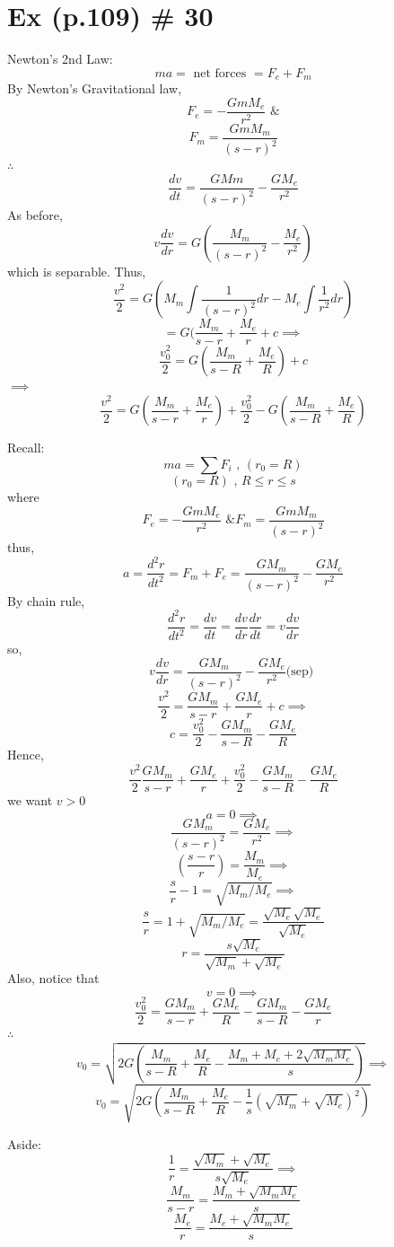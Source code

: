 \documentclass[10pt,a4paper]{article}
\theoremstyle{definition}
\begin{document}
\section*{Ex (p.109) \# 30}
  Newton's 2nd Law: 
  \[ ma = \text{ net forces } = F_e + F_m \]
  By Newton's Gravitational law, 
  \[ F_e = - \frac{GmM_e}{r^2} \text{ \& } \]
  \[ F_m = \frac{GmM_m}{(s-r)^2} \]
  \( \therefore \)
  \[ \frac{dv}{dt} = \frac{GMm}{(s-r)^2}- \frac{GM_e}{r^2} \]
  As before, 
  \[ v \frac{dv}{dr} = G( \frac{M_m}{(s-r)^2} - \frac{M_e}{r^2}) \]
  which is separable. Thus, 
  \[ \frac{v^2}{2} = G( M_m \int \frac{1}{(s-r)^2}dr - M_e \int
  \frac{1}{r^2}dr)  \]
  \[ = G( \frac{M_m}{s-r} + \frac{M_e}{r} + c \implies \]
  \[ \frac{v_0^2}{2} = G( \frac{M_m}{s-R} + \frac{M_e}{R}) + c \]
  \( \implies \)
  \[ \frac{v^2}{2} = G ( \frac{M_m}{s-r} + \frac{M_e}{r}) +
  \frac{v_0^2}{2} -G( \frac{M_m}{s-R}+ \frac{M_e}{R})
  \]

  \newpage
  Recall: 
  \[ ma = \sum F_i \text{ , } (r_0 = R) \]
  \[(r_0 = R) \text{ ,  } R \leq r \leq s \]
  where
  \[ F_e = - \frac{GmM_e}{r^2} \text{ \& } F_m = \frac{GmM_m}{(s-r)^2} \]
  thus, 
  \[ a = \frac{d^2r}{dt^2} = F_m + F_e = \frac{GM_m}{(s-r)^2}-
  \frac{GM_e}{r^2} \]
  By chain rule, 
  \[ \frac{d^2r}{dt^2} = \frac{dv}{dt} = \frac{dv}{dr} \frac{dr}{dt} = v
  \frac{dv}{dr} \]
  so, 
  \[ v \frac{dv}{dr} = \frac{GM_m}{(s-r)^2} - \frac{GM_e}{r^2} \text{
  (sep) } \]
  \[ \frac{v^2}{2} = \frac{GM_m}{s-r}+ \frac{GM_e}{r} + c \implies \]
  \[ c = \frac{v_0^2}{2} - \frac{GM_m}{s-R} - \frac{GM_e}{R} \]
  Hence, 
  \[ \frac{v^2}{2} \frac{GM_m}{s-r} + \frac{GM_e}{r}+ \frac{v_0^2}{2} -
  \frac{GM_m}{s-R} - \frac{GM_e}{R} \]
  we want \( v>0 \) %
  \[ a = 0 \implies \]
  \[ \frac{GM_m}{(s-r)^2} = \frac{GM_e}{r^2} \implies \]
  \[ (\frac{s-r}{r}) = \frac{M_m}{M_e} \implies \]
  \[ \frac{s}{r} -1  = \sqrt{M_m/M_e} \implies \]
  \[ \frac{s}{r} = 1 + \sqrt{M_m/M_e} = \frac{ \sqrt{M_e} \sqrt{M_e}}{
  \sqrt{M_e}} \]
  \[ r = \frac{s \sqrt{M_e}}{ \sqrt{M_m} + \sqrt{M_e}} \]
  Also, notice that 
  \[ v=0 \implies \]
  \[ \frac{v_0^2}{2} = \frac{GM_m}{s-r} + \frac{GM_e}{R} -
  \frac{GM_m}{s-R} - \frac{GM_e}{r} \]
  \( \therefore \)
  \[ v_0 = \sqrt{ 2G ( \frac{M_m}{s-R} + \frac{M_e}{R} - \frac{M_m +M_e +
  2 \sqrt{M_mM_e}}{s})} \implies \]
  \[ \boxed{ v_0 = \sqrt{2G ( \frac{M_m}{s-R} + \frac{M_e}{R} -
  \frac{1}{s}( \sqrt{M_m} + \sqrt{M_e})^2)}} \]

  Aside: 
  \[ \frac{1}{r} = \frac{ \sqrt{M_m} + \sqrt{M_e}}{s \sqrt{M_e}} \implies \]
  \[ \frac{M_m}{s-r} = \frac{M_m + \sqrt{M_mM_e}}{s} \]
  \[ \frac{M_e}{r} = \frac{M_e + \sqrt{M_mM_e}}{s} \]
\end{document}
